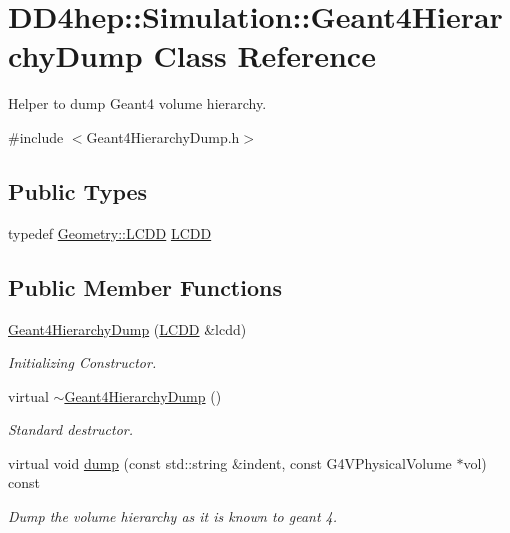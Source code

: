\hypertarget{class_d_d4hep_1_1_simulation_1_1_geant4_hierarchy_dump}{
\section{DD4hep::Simulation::Geant4HierarchyDump Class Reference}
\label{class_d_d4hep_1_1_simulation_1_1_geant4_hierarchy_dump}
}


Helper to dump Geant4 volume hierarchy.  


{\ttfamily \#include $<$Geant4HierarchyDump.h$>$}\subsection*{Public Types}
\begin{DoxyCompactItemize}
\item 
typedef \hyperlink{class_d_d4hep_1_1_geometry_1_1_l_c_d_d}{Geometry::LCDD} \hyperlink{class_d_d4hep_1_1_simulation_1_1_geant4_hierarchy_dump_a4b0ebc3e2346d0ff1c40293d4610f560}{LCDD}
\end{DoxyCompactItemize}
\subsection*{Public Member Functions}
\begin{DoxyCompactItemize}
\item 
\hyperlink{class_d_d4hep_1_1_simulation_1_1_geant4_hierarchy_dump_afcdcc1f61c37b8fcc8c005677b9c2383}{Geant4HierarchyDump} (\hyperlink{class_d_d4hep_1_1_geometry_1_1_l_c_d_d}{LCDD} \&lcdd)
\begin{DoxyCompactList}\small\item\em Initializing Constructor. \item\end{DoxyCompactList}\item 
virtual \hyperlink{class_d_d4hep_1_1_simulation_1_1_geant4_hierarchy_dump_a47d7985316101ad8cbe95c844746f847}{$\sim$Geant4HierarchyDump} ()
\begin{DoxyCompactList}\small\item\em Standard destructor. \item\end{DoxyCompactList}\item 
virtual void \hyperlink{class_d_d4hep_1_1_simulation_1_1_geant4_hierarchy_dump_a34de46e7fbc4a82d126e1ea77c1f0c60}{dump} (const std::string \&indent, const G4VPhysicalVolume $\ast$vol) const 
\begin{DoxyCompactList}\small\item\em Dump the volume hierarchy as it is known to geant 4. \item\end{DoxyCompactList}\end{DoxyCompactItemize}
